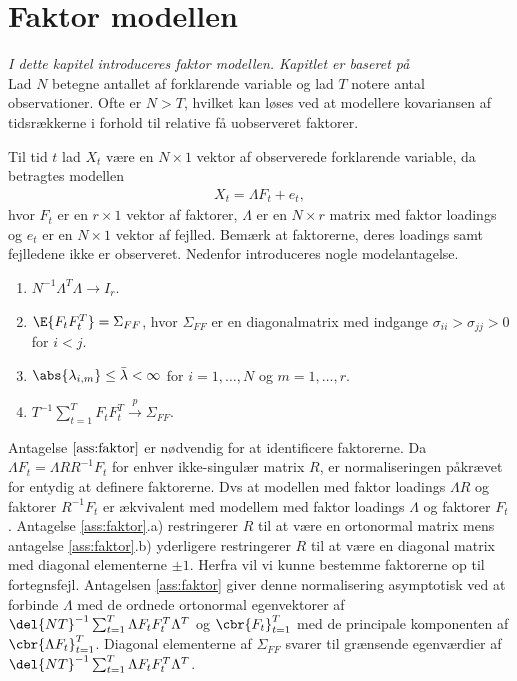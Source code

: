 \chapter{Faktor modellen}
\textit{I dette kapitel introduceres faktor modellen. Kapitlet er baseret på \citep{stock_watson_2002a}} \\[2mm]
%
Lad \(N\) betegne antallet af forklarende variable og lad \(T\) notere antal observationer.
Ofte er \(N > T\), hvilket kan løses ved at modellere kovariansen af tidsrækkerne i forhold til relative få uobserveret faktorer.


Til tid \(t\) lad \(X_t\) være en \(N \times 1\) vektor af observerede forklarende variable, da betragtes modellen
\begin{align}
X_t = \Lambda F_t + e_t, \label{eq:factor_model}
\end{align}
hvor  \(F_t\) er en \(r \times 1\) vektor af faktorer, \(\Lambda\) er en \(N \times r\) matrix med faktor loadings og \(e_t\) er en \(N \times 1\) vektor af fejlled.
Bemærk at faktorerne, deres loadings samt fejlledene ikke er observeret.
%
Nedenfor introduceres nogle modelantagelse.
%
\begin{ass} \label{ass:faktor}
\begin{enumerate}[label=\alph*)]
\item \(N^{-1} \Lambda^T \Lambda \rightarrow I_r\).
\item \(\E{F_t F_t^T} = \Sigma_{FF}\), hvor \(\Sigma_{FF}\) er en diagonalmatrix med indgange \(\sigma_{ii} > \sigma_{jj} > 0\) for \(i < j\).
\item \(\abs{\lambda_{i,m}} \leq \bar{\lambda} < \infty\) for \(i = 1, \ldots, N\) og \(m = 1, \ldots, r\).
\item \(T^{-1} \sum_{t=1}^T F_t F_t^T \overset{p}{\rightarrow} \Sigma_{FF}\).
\end{enumerate}
\end{ass}
%
Antagelse \(\ref{ass:faktor}\) er nødvendig for at identificere faktorerne.
Da \(\Lambda F_t = \Lambda R R^{-1} F_t\) for enhver ikke-singulær matrix \(R\), er normaliseringen påkrævet for entydig at definere faktorerne.
Dvs at modellen med faktor loadings \(\Lambda R\) og faktorer \(R^{-1} F_t\) er ækvivalent med modellem med faktor loadings \(\Lambda\) og faktorer \(F_t\).
Antagelse \ref{ass:faktor}.a) restringerer \(R\) til at være en ortonormal matrix mens antagelse \ref{ass:faktor}.b) yderligere restringerer \(R\) til at være en diagonal matrix med diagonal elementerne \(\pm 1\).
Herfra vil vi kunne bestemme faktorerne op til fortegnsfejl.
Antagelsen \ref{ass:faktor} giver denne normalisering asymptotisk ved at forbinde \(\Lambda\) med de ordnede ortonormal egenvektorer af \(\del{NT}^{-1} \sum_{t=1}^T \Lambda F_t F_t^T \Lambda^T\) og \(\cbr{F_t}_{t=1}^T\) med de principale komponenten af \(\cbr{\Lambda F_t}_{t=1}^T\).
Diagonal elementerne af \(\Sigma_{FF}\) svarer til grænsende egenværdier af \(\del{NT}^{-1} \sum_{t=1}^T \Lambda F_t F_t^T \Lambda^T\).


